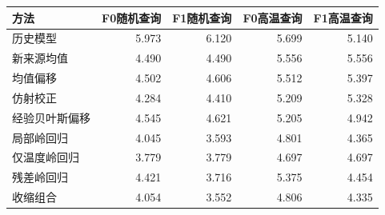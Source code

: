 \begin{tabular}{lrrrr}
\toprule
方法 & F0随机查询 & F1随机查询 & F0高温查询 & F1高温查询 \\
\midrule
历史模型 & 5.973 & 6.120 & 5.699 & 5.140 \\
新来源均值 & 4.490 & 4.490 & 5.556 & 5.556 \\
均值偏移 & 4.502 & 4.606 & 5.512 & 5.397 \\
仿射校正 & 4.284 & 4.410 & 5.209 & 5.328 \\
经验贝叶斯偏移 & 4.545 & 4.621 & 5.205 & 4.942 \\
局部岭回归 & 4.045 & 3.593 & 4.801 & 4.365 \\
仅温度岭回归 & 3.779 & 3.779 & 4.697 & 4.697 \\
残差岭回归 & 4.421 & 3.716 & 5.375 & 4.454 \\
收缩组合 & 4.054 & 3.552 & 4.806 & 4.335 \\
\bottomrule
\end{tabular}
